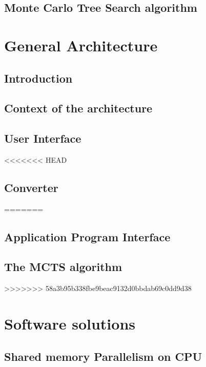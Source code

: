 \documentclass[12pt]{article}
\begin{document}
	\subsection{Monte Carlo Tree Search algorithm}		\label{sec:mcts}			
\newpage

\section{General Architecture}					\label{sec:generalArchitecture} 		
	\subsection{Introduction}			\label{sec:gameBehavioiur}		
	\subsection{Context of the architecture}		\label{sec:globalview}			
	\subsection{User Interface}				\label{sec:ui}				
<<<<<<< HEAD
	\subsection{Converter}		\label{sec:api}				
=======
	\subsection{Application Program Interface}		\label{sec:api}				
	\subsection{The MCTS algorithm}		\label{sec:mctss}				
>>>>>>> 58a3b95b338fbe9beac9132d0bbdab69c0dd9d38
\newpage

\section{Software solutions}					\label{sec:softwareSolutions}
	\subsection{Shared memory Parallelism on CPU}	\label{sec:openmp}			
\end{document}
